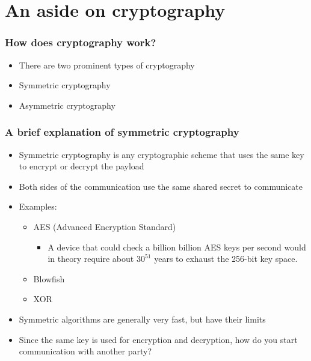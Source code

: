 \documentclass{beamer}
\begin{document}
\section{An aside on cryptography}

\begin{frame}
  \frametitle{How does cryptography work?}
  \begin{itemize}
    \item There are two prominent types of cryptography
    \item Symmetric cryptography
    \item Asymmetric cryptography
  \end{itemize}
\end{frame}

\begin{frame}
  \frametitle{A brief explanation of symmetric cryptography}
  \begin{itemize}
    \item Symmetric cryptography is any cryptographic scheme that uses the same key to encrypt or decrypt the payload
    \item Both sides of the communication use the same shared secret to communicate
    \item Examples:
      \begin{itemize}
	\item AES (Advanced Encryption Standard)
	  \begin{itemize}
	    \item A device that could check a billion billion AES keys per second would in theory require about $30^{51}$ years to exhaust the 256-bit key space.
	  \end{itemize}
	\item Blowfish
	\item XOR
    \end{itemize}
    \pause
  \item Symmetric algorithms are generally very fast, but have their limits
  \item Since the same key is used for encryption and decryption, how do you start communication with another party?
  \end{itemize}
\end{frame}
\end{document}
